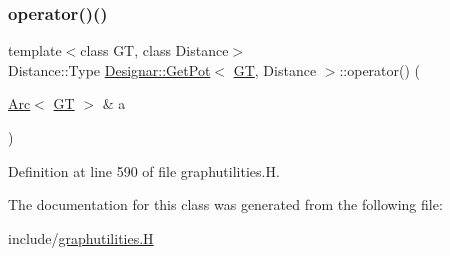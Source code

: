 \subsubsection{\texorpdfstring{operator()()}{operator()()}}
{\footnotesize\ttfamily template$<$class GT, class Distance$>$ \\
Distance\+::\+Type \hyperlink{class_designar_1_1_get_pot}{Designar\+::\+Get\+Pot}$<$ \hyperlink{demo-buildgraph_8_c_a3001c40d2c31ca87ed96cd7d1334a55e}{GT}, Distance $>$\+::operator() (\begin{DoxyParamCaption}\item[{\hyperlink{namespace_designar_a3f55fb5513d62ff47cbc8f72b8e95d6f}{Arc}$<$ \hyperlink{demo-buildgraph_8_c_a3001c40d2c31ca87ed96cd7d1334a55e}{GT} $>$ \&}]{a }\end{DoxyParamCaption})\hspace{0.3cm}{\ttfamily [inline]}}



Definition at line 590 of file graphutilities.\+H.



The documentation for this class was generated from the following file\+:\begin{DoxyCompactItemize}
\item 
include/\hyperlink{graphutilities_8_h}{graphutilities.\+H}\end{DoxyCompactItemize}
